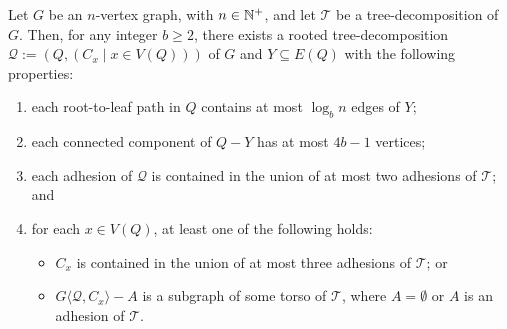 \documentclass{patmorin}
\renewcommand{\ge}{\geqslant}
\newcommand{\pat}[1]{\noindent\textcolor{Magenta}{PaMo: #1}}
\newcommand{\torso}[2]{{#1}\langle{#2}\rangle}
\newcommand{\calQ}{\mathcal{Q}}
\newcommand{\calT}{\mathcal{T}}
\begin{document}
\begin{lem}\label{log_b_td}
  Let $G$ be an $n$-vertex graph, with $n\in\mathbb{N}^+$, and let $\calT$ be a tree-decomposition of $G$.  Then, for any integer $b\ge 2$, there exists a rooted tree-decomposition $\calQ:=(Q,(C_x\mid x\in V(Q)))$ of $G$ and $Y\subseteq E(Q)$ with the following properties:
  \begin{enumerate}[nosep,nolistsep,label=\rm(\alph*)]
    \item\label{req:height_0} each root-to-leaf path in $Q$ contains at most $\log_b n$ edges of $Y$;
    \item\label{req:subtree_size_0} each connected component of $Q-Y$ has at most $4b-1$ vertices;
    \item\label{req:adhesion_width_0} each adhesion of $\calQ$ is contained in the union of at most two adhesions of $\calT$; and
    \item\label{req:subtree_torso_apex_0} for each $x\in V(Q)$, at least one of the following holds:
    \begin{itemize}[nosep,nolistsep]
      \item\label{req:three_adhesions_0} $C_x$ is contained in the union of at most three adhesions of $\calT$; or
      \item\label{req:adhesion_torso_0} $\torso{G}{\calQ,C_x}-A$ is a subgraph of some torso of $\calT$, where $A=\emptyset$ or $A$ is an adhesion of $\calT$.
    \end{itemize}
  \end{enumerate}
\end{lem}

\end{document}
